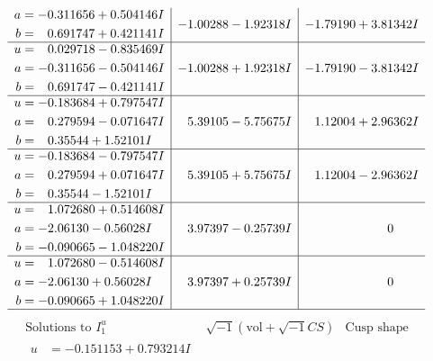\documentclass[1p]{elsarticle_modified}
\theoremstyle{definition}
\newcommand{\I}{\sqrt{-1}}
\begin{document}
$$\begin{array}{c|c|c}
\begin{aligned}
a &= -0.311656 + 0.504146 I \\
b &= \phantom{-}0.691747 + 0.421141 I\end{aligned}
 & -1.00288 - 1.92318 I & -1.79190 + 3.81342 I \\ \hline\begin{aligned}
u &= \phantom{-}0.029718 - 0.835469 I \\
a &= -0.311656 - 0.504146 I \\
b &= \phantom{-}0.691747 - 0.421141 I\end{aligned}
 & -1.00288 + 1.92318 I & -1.79190 - 3.81342 I \\ \hline\begin{aligned}
u &= -0.183684 + 0.797547 I \\
a &= \phantom{-}0.279594 - 0.071647 I \\
b &= \phantom{-}0.35544 + 1.52101 I\end{aligned}
 & \phantom{-}5.39105 - 5.75675 I & \phantom{-}1.12004 + 2.96362 I \\ \hline\begin{aligned}
u &= -0.183684 - 0.797547 I \\
a &= \phantom{-}0.279594 + 0.071647 I \\
b &= \phantom{-}0.35544 - 1.52101 I\end{aligned}
 & \phantom{-}5.39105 + 5.75675 I & \phantom{-}1.12004 - 2.96362 I \\ \hline\begin{aligned}
u &= \phantom{-}1.072680 + 0.514608 I \\
a &= -2.06130 - 0.56028 I \\
b &= -0.090665 - 1.048220 I\end{aligned}
 & \phantom{-}3.97397 - 0.25739 I & \phantom{-0.000000 } 0 \\ \hline\begin{aligned}
u &= \phantom{-}1.072680 - 0.514608 I \\
a &= -2.06130 + 0.56028 I \\
b &= -0.090665 + 1.048220 I\end{aligned}
 & \phantom{-}3.97397 + 0.25739 I & \phantom{-0.000000 } 0\\
 \hline 
 \end{array}$$\newpage$$\begin{array}{c|c|c}  
\text{Solutions to }I^u_{1}& \I (\text{vol} + \sqrt{-1}CS) & \text{Cusp shape}\\
 \hline 
\begin{aligned}
u &= -0.151153 + 0.793214 I \\

\end{aligned}
\end{array}$$
\end{document}
